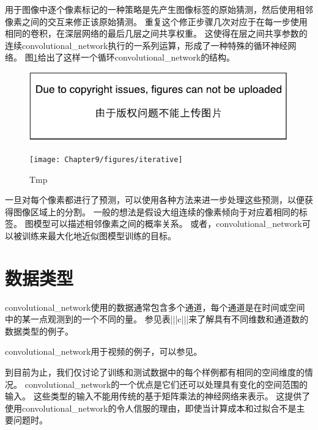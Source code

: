 用于图像中逐个像素标记的一种策略是先产生图像标签的原始猜测，然后使用相邻像素之间的交互来修正该原始猜测。
重复这个修正步骤几次对应于在每一步使用相同的卷积，在深层网络的最后几层之间共享权重\citep{jain2007supervised}。
这使得在层之间共享参数的连续\gls{convolutional_network}执行的一系列运算，形成了一种特殊的循环神经网络\citep{Pinheiro+Collobert-ICML2014,Pinheiro+Collobert-CVPR2015}。
图\ref{fig:chap9_iterative}给出了这样一个循环\gls{convolutional_network}的结构。
\begin{figure}[!htb]
\ifOpenSource
\centerline{\includegraphics{figure.pdf}}
\else
\centerline{\texttt{[image: Chapter9/figures/iterative]}}
\fi
\caption{Tmp}
\label{fig:chap9_iterative}
\end{figure}

 
一旦对每个像素都进行了预测，可以使用各种方法来进一步处理这些预测，以便获得图像区域上的分割\citep{Briggman-et-al-NIPS2009,Turaga2010,Farabet-et-al-2013}。
一般的想法是假设大组连续的像素倾向于对应着相同的标签。
图模型可以描述相邻像素之间的概率关系。
或者，\gls{convolutional_network}可以被训练来最大化地近似图模型训练的目标\citep{Ning-et-al-2005,Thompson-et-al-NIPS2014}。

\section{数据类型}
\label{sec:data_types}

\gls{convolutional_network}使用的数据通常包含多个通道，每个通道是在时间或空间中的某一点观测到的一个不同的量。
参见表|||c|||来了解具有不同维数和通道数的数据类型的例子。
 
  
 
\gls{convolutional_network}用于视频的例子，可以参见\cite{Chen-Ting-2010}。

到目前为止，我们仅讨论了训练和测试数据中的每个样例都有相同的空间维度的情况。
\gls{convolutional_network}的一个优点是它们还可以处理具有变化的空间范围的输入。
这些类型的输入不能用传统的基于矩阵乘法的神经网络来表示。
这提供了使用\gls{convolutional_network}的令人信服的理由，即使当计算成本和过拟合不是主要问题时。

